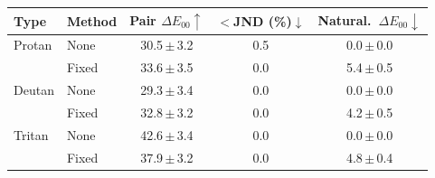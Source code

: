 \begin{tabular}{@{}llccc@{}}
\toprule
Type & Method & Pair $\Delta E_{00}\uparrow$ & ${<}$JND (\%)$\downarrow$ & Natural.\ $\Delta E_{00}\downarrow$ \\
\midrule
Protan & None & 30.5\,$\pm$\,3.2 & 0.5 & 0.0\,$\pm$\,0.0 \\
 & Fixed & 33.6\,$\pm$\,3.5 & 0.0 & 5.4\,$\pm$\,0.5 \\
\midrule
Deutan & None & 29.3\,$\pm$\,3.4 & 0.0 & 0.0\,$\pm$\,0.0 \\
 & Fixed & 32.8\,$\pm$\,3.2 & 0.0 & 4.2\,$\pm$\,0.5 \\
\midrule
Tritan & None & 42.6\,$\pm$\,3.4 & 0.0 & 0.0\,$\pm$\,0.0 \\
 & Fixed & 37.9\,$\pm$\,3.2 & 0.0 & 4.8\,$\pm$\,0.4 \\
\bottomrule
\end{tabular}

